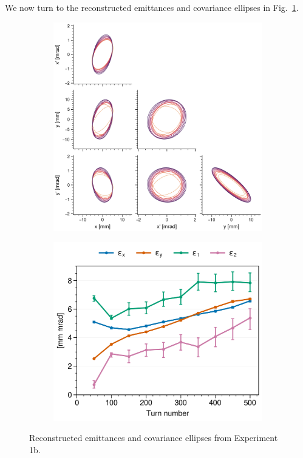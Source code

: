 We now turn to the reconstructed emittances and covariance ellipses in Fig.~\ref{fig:exp1b_emittances}.
%
\begin{figure}[!p]
    \centering
    \begin{subfigure}{0.6\textwidth}
        \includegraphics[width=\textwidth]{Images/chapter5/exp1b/corner.png}
    \end{subfigure}
    \hfill
    \begin{subfigure}[t]{0.39\textwidth}
        \includegraphics[width=\textwidth]{Images/chapter5/exp1b/emittances.png}
    \end{subfigure}
    \caption{Reconstructed emittances and covariance ellipses from Experiment 1b.}
    \label{fig:exp1b_emittances}
\end{figure}
